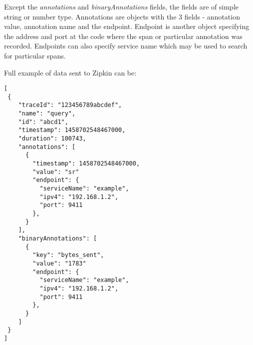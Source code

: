 Except the \textit{annotations} and \textit{binaryAnnotations} fields, the fields are of simple string or number type. Annotations are objects with the 3 fields - annotation value, annotation name and the endpoint. Endpoint is another object specifying the address and port at the code where the span or particular annotation was recorded. Endpoints can also specify service name which may be used to search for particular spans.

Full example of data sent to Zipkin can be:
\begin{lstlisting}[emph={traceId, name, id, timestamp, duration, annotations, value, endpoint, serviceName, ipv4, port, binnaryAnnotations, key},emphstyle={\textbf}]
[
 {
    "traceId": "123456789abcdef",
    "name": "query",
    "id": "abcd1",
    "timestamp": 1458702548467000,
    "duration": 100743,
    "annotations": [
      {
        "timestamp": 1458702548467000,
        "value": "sr"
        "endpoint": {
          "serviceName": "example",
          "ipv4": "192.168.1.2",
          "port": 9411
        },
      }
    ],
    "binaryAnnotations": [
      {
        "key": "bytes_sent",
        "value": "1783"
        "endpoint": {
          "serviceName": "example",
          "ipv4": "192.168.1.2",
          "port": 9411
        },
      }
    ]
 }
]
\end{lstlisting}


